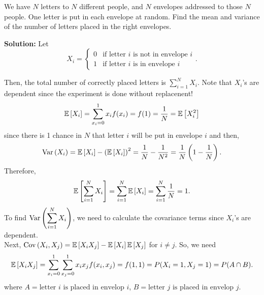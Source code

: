 \pagebreak

\begin{example}
    We have $N$ letters to $N$ different people, and $N$ envelopes addressed to those $N$ people. One letter is put in each envelope at random. Find the mean and variance of the number of letters placed in the right envelopes.

    \textbf{Solution:}
    Let
    \[
        X_i = 
        \begin{cases} 
            0 & \text{if letter $i$ is not in envelope $i$} \\
            1 & \text{if letter $i$ is in envelope $i$}
        \end{cases}.
    \]

    Then, the total number of correctly placed letters is $\displaystyle \sum_{i=1}^{N} X_i$. Note that $X_i$'s are dependent since the experiment is done without replacenent!
    \[
        \mathbb{E}\left[{X_i}\right] = \displaystyle \sum_{x_i=0}^{1} x_if(x_i) = f(1) = \frac{1}{N} = \mathbb{E}\left[{X_i^2}\right]
    \]
    since there is 1 chance in $N$ that letter $i$ will be put in envelope $i$ and then,
    \[
        \operatorname{Var}\left({X_i}\right) = \mathbb{E}\left[{X_i}\right] - \left( \mathbb{E}\left[{X_i}\right] \right)^2 = \frac{1}{N} - \frac{1}{N^2} = \frac{1}{N}\left( 1 - \frac{1}{N} \right).
    \]
    Therefore,
    \[
        \mathbb{E}\left[{\displaystyle \sum_{i=1}^{N} X_i}\right] = \displaystyle \sum_{i=1}^{N} \mathbb{E}\left[{X_i}\right] = \displaystyle \sum_{i=1}^{N} \frac{1}{N} = 1.
    \]
    To find $\operatorname{Var}\left({\displaystyle \sum_{i=1}^{N} X_i}\right)$, we need to calculate the covariance terms since $X_i$'s are dependent. \\
    Next, $\operatorname{Cov}\left({X_i,X_j}\right) = \mathbb{E}\left[{X_i X_j}\right] - \mathbb{E}\left[{X_i}\right] \mathbb{E}\left[{X_j}\right]$ for $i \neq j$. So, we need
    \[
        \mathbb{E}\left[{X_i X_j}\right] = \displaystyle \sum_{x_i = 0}^{1} \displaystyle \sum_{x_j=0}^{1} x_i x_j f(x_i,x_j) = f(1,1) = P(X_i = 1, X_j = 1) = P(A \cap B).
    \]
    where $A = \text{letter $i$ is placed in envelop $i$}$, $B = \text{letter $j$ is placed in envelop $j$}$.
\end{example}





\newpage